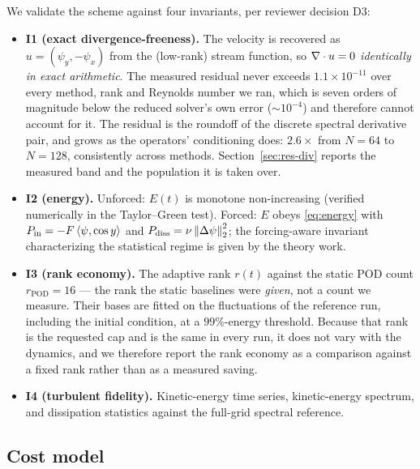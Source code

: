 We validate the scheme against four invariants, per reviewer decision D3:

\begin{itemize}
  \item \textbf{I1 (exact divergence-freeness).} The velocity is recovered as
  $u = (\psi_y, -\psi_x)$ from the (low-rank) stream function, so
  $\nabla \cdot u = 0$ \emph{identically in exact arithmetic}. The measured
  residual never exceeds $1.1\times 10^{-11}$ over every method, rank and
  Reynolds number we ran, which is seven orders of magnitude below the reduced
  solver's own error ($\sim 10^{-4}$) and therefore cannot account for it. The
  residual is the roundoff of the discrete spectral derivative pair, and grows as
  the operators' conditioning does: $2.6\times$ from $N=64$ to $N=128$,
  consistently across methods. Section~\ref{sec:res-div} reports the measured
  band and the population it is taken over.
  \item \textbf{I2 (energy).} Unforced: $E(t)$ is monotone non-increasing
  (verified numerically in the Taylor--Green test). Forced: $E$ obeys
  \eqref{eq:energy} with $P_{\mathrm{in}} = -F\left\langle \psi, \cos y \right\rangle$ and
  $P_{\mathrm{diss}} = \nu \left\lVert \Delta \psi \right\rVert_2^2$; the forcing-aware
  invariant characterizing the statistical regime is given by the theory
  work.
  \item \textbf{I3 (rank economy).} The adaptive rank $r(t)$ against the static
  POD count $r_{\mathrm{POD}} = 16$ --- the rank the static baselines were
  \emph{given}, not a count we measure. Their bases are fitted on the
  fluctuations of the reference run, including the initial condition, at a
  $99\%$-energy threshold. Because that rank is the requested cap and is the same
  in every run, it does not vary with the dynamics, and we therefore report the
  rank economy as a comparison against a fixed rank rather than as a measured
  saving.
  \item \textbf{I4 (turbulent fidelity).} Kinetic-energy time series,
  kinetic-energy spectrum, and dissipation statistics against the full-grid
  spectral reference.
\end{itemize}

\subsection{Cost model}
\label{sec:cost}

